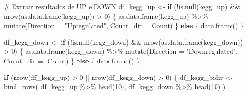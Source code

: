 \documentclass[
  letterpaper,
  DIV=11,
  numbers=noendperiod]{scrreprt}
\newenvironment{Shaded}{\begin{snugshade}}{\end{snugshade}}
\newcommand{\AttributeTok}[1]{\textcolor[rgb]{0.40,0.45,0.13}{#1}}
\newcommand{\CommentTok}[1]{\textcolor[rgb]{0.37,0.37,0.37}{#1}}
\newcommand{\ControlFlowTok}[1]{\textcolor[rgb]{0.00,0.23,0.31}{\textbf{#1}}}
\newcommand{\DecValTok}[1]{\textcolor[rgb]{0.68,0.00,0.00}{#1}}
\newcommand{\FunctionTok}[1]{\textcolor[rgb]{0.28,0.35,0.67}{#1}}
\newcommand{\NormalTok}[1]{\textcolor[rgb]{0.00,0.23,0.31}{#1}}
\newcommand{\OtherTok}[1]{\textcolor[rgb]{0.00,0.23,0.31}{#1}}
\newcommand{\SpecialCharTok}[1]{\textcolor[rgb]{0.37,0.37,0.37}{#1}}
\newcommand{\StringTok}[1]{\textcolor[rgb]{0.13,0.47,0.30}{#1}}
\begin{document}
\begin{Shaded}
\begin{Highlighting}[]
\CommentTok{\# Extrair resultados de UP e DOWN}
\NormalTok{df\_kegg\_up }\OtherTok{\textless{}{-}} \ControlFlowTok{if}\NormalTok{ (}\SpecialCharTok{!}\FunctionTok{is.null}\NormalTok{(kegg\_up) }\SpecialCharTok{\&\&} \FunctionTok{nrow}\NormalTok{(}\FunctionTok{as.data.frame}\NormalTok{(kegg\_up)) }\SpecialCharTok{\textgreater{}} \DecValTok{0}\NormalTok{) \{}
  \FunctionTok{as.data.frame}\NormalTok{(kegg\_up) }\SpecialCharTok{\%\textgreater{}\%} \FunctionTok{mutate}\NormalTok{(}\AttributeTok{Direction =} \StringTok{"Upregulated"}\NormalTok{, }\AttributeTok{Count\_dir =}\NormalTok{ Count)}
\NormalTok{\} }\ControlFlowTok{else}\NormalTok{ \{ }\FunctionTok{data.frame}\NormalTok{() \}}

\NormalTok{df\_kegg\_down }\OtherTok{\textless{}{-}} \ControlFlowTok{if}\NormalTok{ (}\SpecialCharTok{!}\FunctionTok{is.null}\NormalTok{(kegg\_down) }\SpecialCharTok{\&\&} \FunctionTok{nrow}\NormalTok{(}\FunctionTok{as.data.frame}\NormalTok{(kegg\_down)) }\SpecialCharTok{\textgreater{}} \DecValTok{0}\NormalTok{) \{}
  \FunctionTok{as.data.frame}\NormalTok{(kegg\_down) }\SpecialCharTok{\%\textgreater{}\%} \FunctionTok{mutate}\NormalTok{(}\AttributeTok{Direction =} \StringTok{"Downregulated"}\NormalTok{, }\AttributeTok{Count\_dir =} \SpecialCharTok{{-}}\NormalTok{Count)}
\NormalTok{\} }\ControlFlowTok{else}\NormalTok{ \{ }\FunctionTok{data.frame}\NormalTok{() \}}

\ControlFlowTok{if}\NormalTok{ (}\FunctionTok{nrow}\NormalTok{(df\_kegg\_up) }\SpecialCharTok{\textgreater{}} \DecValTok{0} \SpecialCharTok{||} \FunctionTok{nrow}\NormalTok{(df\_kegg\_down) }\SpecialCharTok{\textgreater{}} \DecValTok{0}\NormalTok{) \{}
\NormalTok{  df\_kegg\_bidir }\OtherTok{\textless{}{-}} \FunctionTok{bind\_rows}\NormalTok{(}
\NormalTok{    df\_kegg\_up }\SpecialCharTok{\%\textgreater{}\%} \FunctionTok{head}\NormalTok{(}\DecValTok{10}\NormalTok{),}
\NormalTok{    df\_kegg\_down }\SpecialCharTok{\%\textgreater{}\%} \FunctionTok{head}\NormalTok{(}\DecValTok{10}\NormalTok{)}
\NormalTok{  )}


\end{Highlighting}
\end{Shaded}
\end{document}
